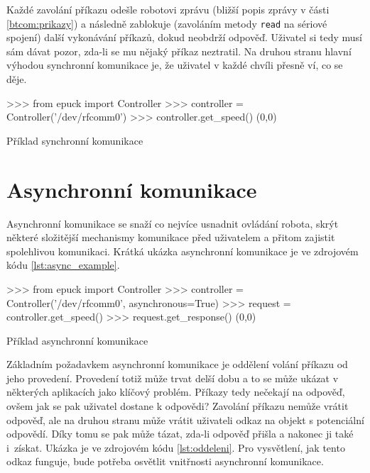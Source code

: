     Každé zavolání příkazu odešle robotovi zprávu (bližší popis zprávy v části
    \ref{btcom:prikazy}) a následně zablokuje (zavoláním metody {\tt read} na
    sériové spojení) další vykonávání příkazů, dokud neobdrží odpověď. Uživatel
    si tedy musí sám dávat pozor, zda-li se mu nějaký příkaz neztratil. Na
    druhou stranu hlavní výhodou synchronní komunikace je, že uživatel v každé
    chvíli přesně ví, co se děje.

    \begin{listing}[H]
    \begin{pyc}
>>> from epuck import Controller
>>> controller = Controller('/dev/rfcomm0')
>>> controller.get_speed()
(0,0)
    \end{pyc}
    \caption{Příklad synchronní komunikace}
    \label{lst:sync_example}
    \end{listing}

    \section{Asynchronní komunikace}
    \label{async-impl}

    Asynchronní komunikace se snaží co nejvíce usnadnit ovládání robota, skrýt
    některé složitější mechanismy komunikace před uživatelem a přitom zajistit
    spolehlivou komunikaci. Krátká ukázka asynchronní komunikace je ve
    zdrojovém kódu \ref{lst:async_example}.

    \begin{listing}[H]
    \begin{pyc}
>>> from epuck import Controller
>>> controller = Controller('/dev/rfcomm0', asynchronous=True)
>>> request = controller.get_speed()
>>> request.get_response()
(0,0)
    \end{pyc}
    \caption{Příklad asynchronní komunikace}
    \label{lst:async_example}
    \end{listing}

    Základním požadavkem asynchronní komunikace je oddělení volání příkazu od
    jeho provedení. Provedení totiž může trvat delší dobu a to se může ukázat v
    některých aplikacích jako klíčový problém. Příkazy tedy nečekají na
    odpověď, ovšem jak se pak uživatel dostane k odpovědi? Zavolání příkazu
    nemůže vrátit odpověď, ale na druhou stranu může vrátit uživateli odkaz na
    objekt s potenciální odpovědí. Díky tomu se pak může tázat, zda-li odpověď
    přišla a nakonec ji také i~získat. Ukázka je ve zdrojovém kódu
    \ref{lst:oddeleni}. Pro vysvětlení, jak tento odkaz funguje, bude potřeba
    osvětlit vnitřnosti asynchronní komunikace.

